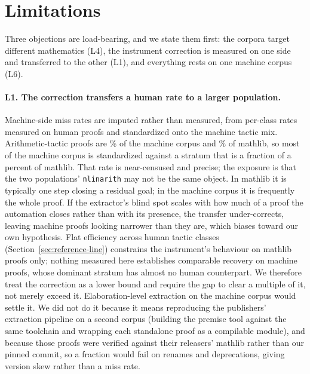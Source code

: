 
\section{Limitations}
\label{sec:limitations}

Three objections are load-bearing, and we state them first:
the corpora target different mathematics (L4), the instrument correction is
measured on one side and transferred to the other (L1), and everything rests on
one machine corpus (L6).

\paragraph{L1. The correction transfers a human rate to a larger population.}
Machine-side miss rates are imputed rather than measured, from per-class rates
measured on human proofs and standardized onto the machine tactic mix.
Arithmetic-tactic proofs are \machineArithMixPct{}\% of the machine corpus and
\humanArithMixPct{}\% of mathlib, so most of the machine corpus is standardized
against a stratum that is a fraction of a percent of mathlib. That rate is
near-censused and precise; the exposure is that the two populations'
\texttt{nlinarith} may not be the same object. In mathlib it is typically one
step closing a residual goal; in the machine corpus it is frequently the whole
proof. If the extractor's blind spot scales with how much of a proof
the automation closes rather than with its presence, the transfer
under-corrects, leaving machine proofs looking narrower than they are, which
biases toward our own hypothesis. Flat efficiency across human tactic classes
(Section~\ref{sec:reference-line}) constrains the instrument's behaviour on
mathlib proofs only; nothing measured here establishes comparable recovery on
machine proofs, whose dominant stratum has almost no human counterpart. We
therefore treat the correction as a lower bound and require the gap to clear a
multiple of it, not merely exceed it. Elaboration-level extraction on the machine corpus would settle it. We did not
do it because it means reproducing the publishers' extraction pipeline on a
second corpus (building the premise tool against the same toolchain and
wrapping each standalone proof as a compilable module), and because those
proofs were verified against their releasers' mathlib rather than our pinned
commit, so a fraction would fail on renames and deprecations, giving version
skew rather than a miss rate.


